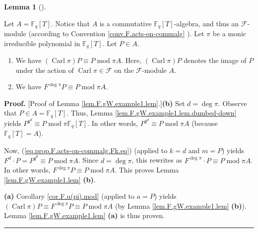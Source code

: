 \documentclass[numbers=enddot,12pt,final,onecolumn,notitlepage]{scrartcl}%
\theoremstyle{definition}
\newtheorem{lem}[theo]{Lemma}
\newenvironment{lemma}[1][]
{\begin{lem}[#1]\begin{leftbar}}
{\end{leftbar}\end{lem}}
\newenvironment{proof}[1][Proof]{\noindent\textbf{#1.} }{\ \rule{0.5em}{0.5em}}
\begin{document}
\begin{lemma}
\label{lem.F.gW.example1.lem}Let $A=\mathbb{F}_{q}\left[  T\right]  $. Notice
that $A$ is a commutative $\mathbb{F}_{q}\left[  T\right]  $-algebra, and thus
an $\mathcal{F}$-module (according to Convention \ref{conv.F.acts-on-commalg}%
). Let $\pi$ be a monic irreducible polynomial in $\mathbb{F}_{q}\left[
T\right]  $. Let $P\in A$.

\begin{enumerate}
\item[\textbf{(a)}] We have $\left(  \operatorname*{Carl}\pi\right)  P\equiv
P\operatorname{mod}\pi A$. Here, $\left(  \operatorname*{Carl}\pi\right)  P$
denotes the image of $P$ under the action of $\operatorname*{Carl}\pi
\in\mathcal{F}$ on the $\mathcal{F}$-module $A$.

\item[\textbf{(b)}] We have $F^{\deg\pi}P\equiv P\operatorname{mod}\pi A$.
\end{enumerate}
\end{lemma}

\begin{proof}
[Proof of Lemma \ref{lem.F.gW.example1.lem}.]\textbf{(b)} Set $d=\deg\pi$.
Observe that $P\in A=\mathbb{F}_{q}\left[  T\right]  $. Thus, Lemma
\ref{lem.F.gW.example1.lem.dumbed-down} yields $P^{q^{d}}\equiv
P\operatorname{mod}\pi\mathbb{F}_{q}\left[  T\right]  $. In other words,
$P^{q^{d}}\equiv P\operatorname{mod}\pi A$ (because $\mathbb{F}_{q}\left[
T\right]  =A$).

Now, (\ref{eq.prop.F.acts-on-commalg.Fk.eq}) (applied to $k=d$ and $m=P$)
yields $F^{d}\cdot P=P^{q^{d}}\equiv P\operatorname{mod}\pi A$. Since
$d=\deg\pi$, this rewrites as $F^{\deg\pi}\cdot P\equiv P\operatorname{mod}\pi
A$. In other words, $F^{\deg\pi}P\equiv P\operatorname{mod}\pi A$. This proves
Lemma \ref{lem.F.gW.example1.lem} \textbf{(b)}. \medskip

\textbf{(a)} Corollary \ref{cor.F.u(pi).mod} (applied to $a=P$) yields
$\left(  \operatorname*{Carl}\pi\right)  P\equiv F^{\deg\pi}P\equiv
P\operatorname{mod}\pi A$ (by Lemma \ref{lem.F.gW.example1.lem} \textbf{(b)}).
Lemma \ref{lem.F.gW.example1.lem} \textbf{(a)} is thus proven.
\end{proof}
\end{document}
